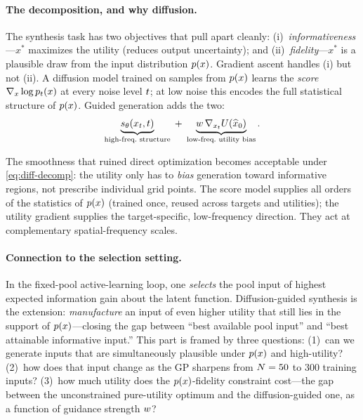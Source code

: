 \paragraph{The decomposition, and why diffusion.}
The synthesis task has two objectives that pull apart cleanly:
(i)~\emph{informativeness}---$x^{*}$ maximizes the utility (reduces output
uncertainty); and (ii)~\emph{fidelity}---$x^{*}$ is a plausible draw from the input
distribution $p(x)$. Gradient ascent handles (i) but not (ii). A diffusion model
trained on samples from $p(x)$ learns the \emph{score}
$\nabla_{x}\log p_{t}(x)$ at every noise level $t$; at low noise this encodes
the full statistical structure of $p(x)$. Guided generation adds the two:
\begin{equation}
\underbrace{\score(\xt,\dt)}_{\text{high-freq.\ structure}}
\;+\;
\underbrace{\gw\,\nabla_{\xt}U(\xhat)}_{\text{low-freq.\ utility bias}} .
\label{eq:diff-decomp}
\end{equation}

\begin{remark}
The smoothness that ruined direct optimization becomes acceptable under
\eqref{eq:diff-decomp}: the utility only has to \emph{bias} generation toward
informative regions, not prescribe individual grid points. The score model supplies
all orders of the statistics of $p(x)$ (trained once, reused across targets and
utilities); the utility gradient supplies the target-specific, low-frequency
direction. They act at complementary spatial-frequency scales.
\end{remark}

\paragraph{Connection to the selection setting.}
In the fixed-pool active-learning loop, one \emph{selects} the pool input of
highest expected information gain about the latent function. Diffusion-guided
synthesis is the extension: \emph{manufacture} an input of even higher utility that
still lies in the support of $p(x)$---closing the gap between ``best available pool
input'' and ``best attainable informative input.'' This part is framed by three
questions: (1)~can we generate inputs that are simultaneously plausible under $p(x)$
and high-utility?  (2)~how does that input change as the GP sharpens from
$N=50$ to $300$ training inputs?  (3)~how much utility does the $p(x)$-fidelity
constraint cost---the gap between the unconstrained pure-utility optimum and the
diffusion-guided one, as a function of guidance strength $w$?


